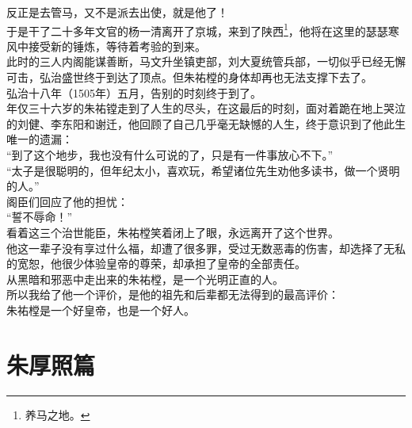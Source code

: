 \begin{multicols}{\theparacolNo}
反正是去管马，又不是派去出使，就是他了！\\

于是干了二十多年文官的杨一清离开了京城，来到了陕西\footnote{养马之地。}，他将在这里的瑟瑟寒风中接受新的锤炼，等待着考验的到来。\\

此时的三人内阁能谋善断，马文升坐镇吏部，刘大夏统管兵部，一切似乎已经无懈可击，弘治盛世终于到达了顶点。但朱祐樘的身体却再也无法支撑下去了。\\

弘治十八年（1505年）五月，告别的时刻终于到了。\\

年仅三十六岁的朱祐镗走到了人生的尽头，在这最后的时刻，面对着跪在地上哭泣的刘健、李东阳和谢迁，他回顾了自己几乎毫无缺憾的人生，终于意识到了他此生唯一的遗漏：\\

“到了这个地步，我也没有什么可说的了，只是有一件事放心不下。”\\

“太子是很聪明的，但年纪太小，喜欢玩，希望诸位先生劝他多读书，做一个贤明的人。”\\

阁臣们回应了他的担忧：\\

“誓不辱命！”\\

看着这三个治世能臣，朱祐樘笑着闭上了眼，永远离开了这个世界。\\

他这一辈子没有享过什么福，却遭了很多罪，受过无数恶毒的伤害，却选择了无私的宽恕，他很少体验皇帝的尊荣，却承担了皇帝的全部责任。\\

从黑暗和邪恶中走出来的朱祐樘，是一个光明正直的人。\\

所以我给了他一个评价，是他的祖先和后辈都无法得到的最高评价：\\

朱祐樘是一个好皇帝，也是一个好人。\\
\ifnum{}
	\end{multicols}
\fi
\newpage
\chapter*{朱厚照篇}
